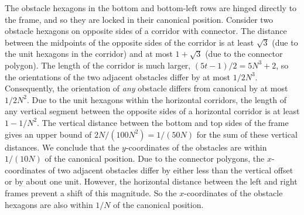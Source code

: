 \documentclass[runningheads]{article}
\begin{document}
The obstacle hexagons in the bottom and bottom-left rows are hinged directly to the frame,
and so they are locked in their canonical position. Consider two obstacle hexagons on opposite
sides of a corridor with connector. The distance between the midpoints of the opposite sides of
the corridor is at least $\sqrt{3}$ (due to the unit hexagons in the corridor) and at most
$1+\sqrt{3}$ (due to the connector polygon). The length of the corridor is much larger,
$(5t-1)/2=5N^3+2$, so the orientations of the two adjacent obstacles differ by at most $1/2N^3$.
Consequently, the orientation of \emph{any} obstacle differs from canonical by at most $1/2N^2$.
Due to the unit hexagons within the horizontal corridors, the length of any vertical segment between
the opposite sides of a horizontal corridor is at least $1-1/N^2$. The vertical distance between the
bottom and top sides of the frame gives an upper bound of  $2N/(100N^2)=1/(50N)$ for the sum of these
vertical distances. We conclude that the $y$-coordinates of the obstacles are within $1/(10N)$
of the canonical position. Due to the connector polygons, the $x$-coordinates of
two adjacent obstacles differ by either less than the vertical offset or by about
one unit. However, the horizontal distance between the left and right frames prevent
a shift of this magnitude. So the $x$-coordinates of the obstacle hexagons are also
within $1/N$ of the canonical position.
\end{document}
